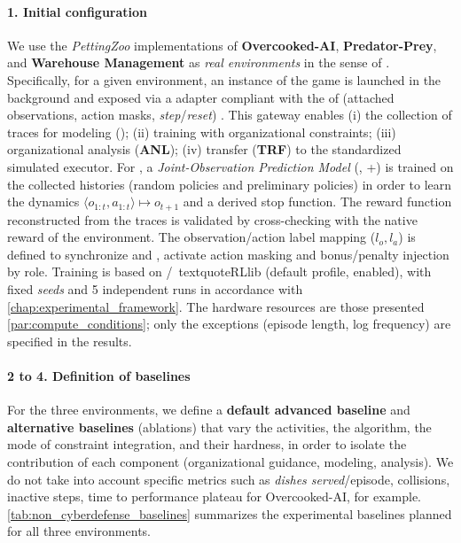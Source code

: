 \paragraph{1. Initial configuration}

We use the \emph{PettingZoo} implementations of \phantom{X} \textbf{Overcooked-AI}, \textbf{Predator-Prey}, and \textbf{Warehouse Management} as \emph{real environments} in the sense of . Specifically, for a given environment, an instance of the game is launched in the background and exposed via a  adapter compliant with the  of  (attached observations, action masks, \emph{step}/\emph{reset}) . This gateway enables (i) the collection of traces for modeling (); (ii)  training with organizational constraints; (iii) organizational analysis (\textbf{ANL}); (iv) transfer (\textbf{TRF}) to the standardized simulated executor.
For , a \emph{Joint-Observation Prediction Model} (, +) is trained on the collected histories (random policies and preliminary policies) in order to learn the dynamics $\langle o_{1:t},a_ {1:t} \rangle \mapsto o_{t+1}$ and a derived stop function. The reward function reconstructed from the traces is validated by cross-checking with the native reward of the environment. The observation/action label mapping ($l_o, l_a$) is defined to synchronize  and , activate action masking and bonus/penalty injection by role. Training is based on /\ textquote{RLlib} (default  profile,  enabled), with fixed \textit{seeds} and 5 independent runs in accordance with \autoref{chap:experimental_framework}. The hardware resources are those presented \autoref{par:compute_conditions}; only the exceptions (episode length, log frequency) are specified in the results.

\paragraph{2 to 4. Definition of baselines}

For the three environments, we define a \textbf{default advanced baseline} and \textbf{alternative baselines} (ablations) that vary the  activities, the  algorithm, the mode of constraint integration, and their hardness, in order to isolate the contribution of each component (organizational guidance, modeling, analysis). We do not take into account specific metrics such as \emph{dishes served}/episode, collisions, inactive steps, time to performance plateau for Overcooked-AI, for example. \autoref{tab:non_cyberdefense_baselines} summarizes the experimental baselines planned for all three environments.


